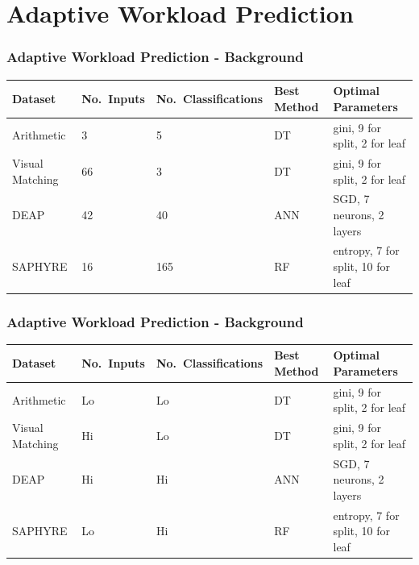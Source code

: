 \documentclass{beamer}
\begin{document}
\section{Adaptive Workload Prediction}

\begin{frame}
\frametitle{Adaptive Workload Prediction - Background}
\begin{table}[!t]
\renewcommand{\arraystretch}{1.3}
\centering
\resizebox{\textwidth}{!}
{\begin{tabular}{*{5}{l}}
\toprule
Dataset & No.~Inputs & No.~Classifications & Best Method & Optimal Parameters \\ \midrule
Arithmetic & 3 & 5 & DT & gini, 9 for split, 2 for leaf\\
Visual Matching & 66 & 3 & DT & gini, 9 for split, 2 for leaf \\
DEAP & 42 & 40 & ANN & SGD, 7 neurons, 2 layers \\
SAPHYRE & 16 & 165 & RF & entropy, 7 for split, 10 for leaf \\ \bottomrule
\end{tabular}}
\end{table}
\end{frame}

\begin{frame}
\frametitle{Adaptive Workload Prediction - Background}
\begin{table}[!t]
\renewcommand{\arraystretch}{1.3}
\centering
\resizebox{\textwidth}{!}
{\begin{tabular}{*{5}{l}}
\toprule
Dataset & No.~Inputs & No.~Classifications & Best Method & Optimal Parameters \\ \midrule
Arithmetic & Lo & Lo & DT & gini, 9 for split, 2 for leaf\\
Visual Matching & Hi & Lo & DT & gini, 9 for split, 2 for leaf \\
DEAP & Hi & Hi & ANN & SGD, 7 neurons, 2 layers \\
SAPHYRE & Lo & Hi & RF & entropy, 7 for split, 10 for leaf \\ \bottomrule
\end{tabular}}
\end{table}
\end{frame}
\end{document}
